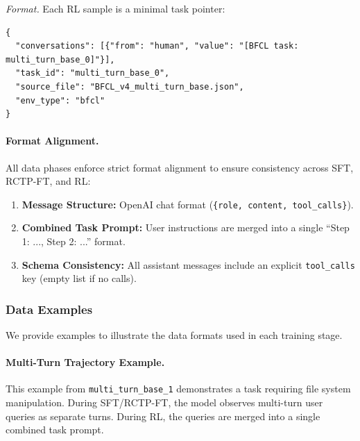 \documentclass{article}
\theoremstyle{plain}
\theoremstyle{definition}
\theoremstyle{remark}
\begin{document}
\textit{Format.} Each RL sample is a minimal task pointer:
\begin{verbatim}
{
  "conversations": [{"from": "human", "value": "[BFCL task: multi_turn_base_0]"}],
  "task_id": "multi_turn_base_0",
  "source_file": "BFCL_v4_multi_turn_base.json",
  "env_type": "bfcl"
}
\end{verbatim}

\paragraph{Format Alignment.}
All data phases enforce strict format alignment to ensure consistency across SFT, RCTP-FT, and RL:
\begin{enumerate}
    \item \textbf{Message Structure:} OpenAI chat format (\texttt{\{role, content, tool\_calls\}}).
    \item \textbf{Combined Task Prompt:} User instructions are merged into a single ``Step 1: ..., Step 2: ...'' format.
    \item \textbf{Schema Consistency:} All assistant messages include an explicit \texttt{tool\_calls} key (empty list if no calls).
\end{enumerate}

\subsubsection{Data Examples}
\label{app:examples}

We provide examples to illustrate the data formats used in each training stage.

\paragraph{Multi-Turn Trajectory Example.}
This example from \texttt{multi\_turn\_base\_1} demonstrates a task requiring file system manipulation. During SFT/RCTP-FT, the model observes multi-turn user queries as separate turns. During RL, the queries are merged into a single combined task prompt.
\end{document}
